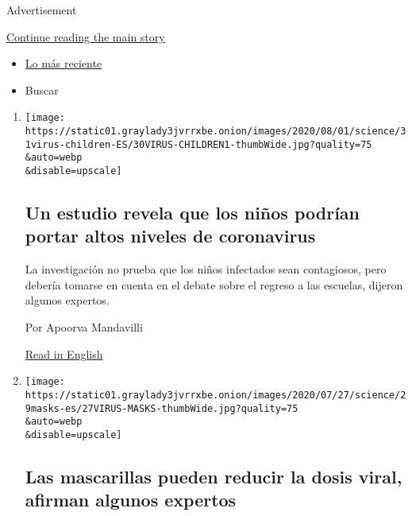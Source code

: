 Advertisement

\protect\hyperlink{after-mid1}{Continue reading the main story}

\begin{itemize}
\tightlist
\item
  \protect\hyperlink{stream-panel}{Lo más reciente}
\item
  Buscar
\end{itemize}

\begin{enumerate}
\def\labelenumi{\arabic{enumi}.}
\item
  \href{/es/2020/07/31/espanol/ciencia-y-tecnologia/ninos-contagio-coronavirus.html}{}

  \texttt{[image: https://static01.graylady3jvrrxbe.onion/images/2020/08/01/science/31virus-children-ES/30VIRUS-CHILDREN1-thumbWide.jpg?quality=75\\\&auto=webp\\\&disable=upscale]}

  \hypertarget{un-estudio-revela-que-los-niuxf1os-podruxedan-portar-altos-niveles-de-coronavirus}{%
  \subsection{Un estudio revela que los niños podrían portar altos
  niveles de
  coronavirus}\label{un-estudio-revela-que-los-niuxf1os-podruxedan-portar-altos-niveles-de-coronavirus}}

  La investigación no prueba que los niños infectados sean contagiosos,
  pero debería tomarse en cuenta en el debate sobre el regreso a las
  escuelas, dijeron algunos expertos.

  Por Apoorva Mandavilli

  \href{https://www.nytimes3xbfgragh.onion/2020/07/30/health/coronavirus-children.html}{Read
  in English}
\item
  \href{/es/2020/07/29/espanol/ciencia-y-tecnologia/proteccion-cubrebocas-coronavirus.html}{}

  \texttt{[image: https://static01.graylady3jvrrxbe.onion/images/2020/07/27/science/29masks-es/27VIRUS-MASKS-thumbWide.jpg?quality=75\\\&auto=webp\\\&disable=upscale]}

  \hypertarget{las-mascarillas-pueden-reducir-la-dosis-viral-afirman-algunos-expertos}{%
  \subsection{Las mascarillas pueden reducir la dosis viral, afirman
  algunos
  expertos}\label{las-mascarillas-pueden-reducir-la-dosis-viral-afirman-algunos-expertos}}


\end{enumerate}
